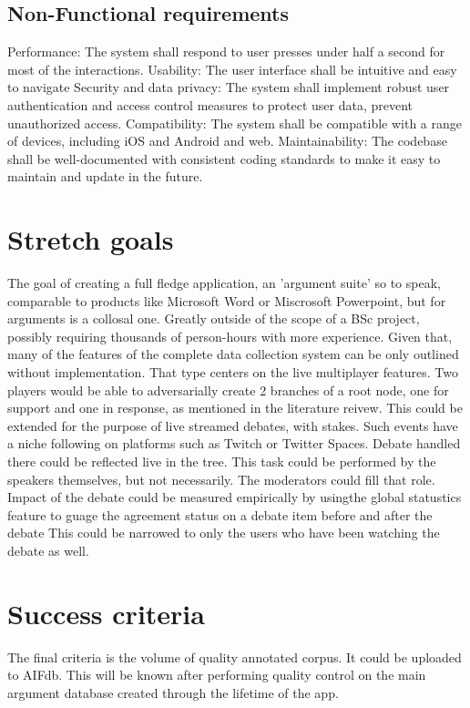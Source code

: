 \documentclass{report}
\begin{document}
{\subsection{Non-Functional requirements}
Performance: The system shall respond to user presses under half a second for most of the interactions.
Usability: The user interface shall be intuitive and easy to navigate
Security and data privacy: The system shall implement robust user authentication and access control measures to protect user data, prevent unauthorized access.
Compatibility: The system shall be compatible with a range of devices, including iOS and Android and web.
Maintainability: The codebase shall be well-documented with consistent coding standards to make it easy to maintain and update in the future.

\section{Stretch goals}
The goal of creating a full fledge application, an 'argument suite' so to speak, comparable to products like Microsoft Word or Miscrosoft Powerpoint, but for arguments is a collosal one.
Greatly outside of the scope of a BSc project, possibly requiring thousands of person-hours with more experience.
Given that, many of the features of the complete data collection system can be only outlined without implementation.
That type centers on the live multiplayer features. Two players would be able to adversarially create 2 branches of a root node, one for support and one in response, as mentioned in the literature reivew. 
This could be extended for the purpose of live streamed debates, with stakes. Such events have a niche following on platforms such as Twitch or Twitter Spaces.
Debate handled there could be reflected live in the tree. This task could be performed by the speakers themselves, but not necessarily. The moderators could fill that role.
Impact of the debate could be measured empirically by usingthe global statustics feature to guage the agreement status on a debate item before and after the debate
This could be narrowed to only the users who have been watching the debate as well.

\section{Success criteria}
The final criteria is the volume of quality annotated corpus. It could be uploaded to AIFdb. 
This will be known after performing quality control on the main argument database created through the lifetime of the app. 

}
\end{document}
